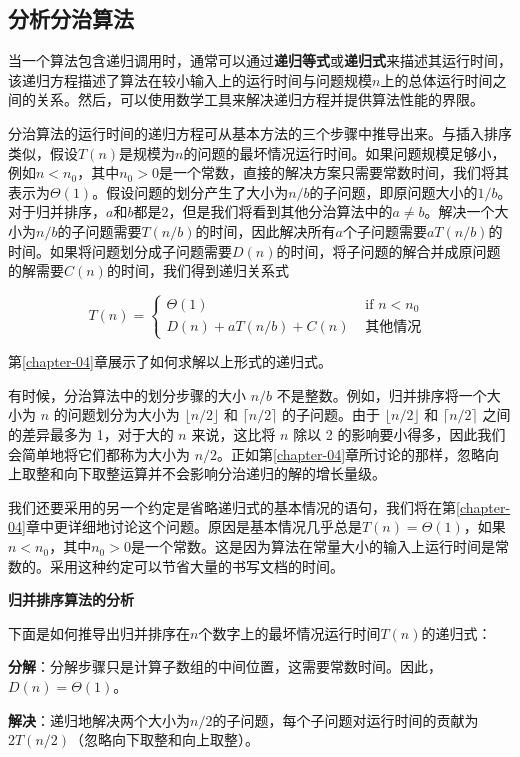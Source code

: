 \documentclass[lang=cn,newtx,10pt,scheme=chinese]{elegantbook}
\begin{document}
\subsection{分析分治算法}\label{subsection-2.3.2}

当一个算法包含递归调用时，通常可以通过\textbf{递归等式}或\textbf{递归式}来描述其运行时间，该递归方程描述了算法在较小输入上的运行时间与问题规模$n$上的总体运行时间之间的关系。然后，可以使用数学工具来解决递归方程并提供算法性能的界限。

分治算法的运行时间的递归方程可从基本方法的三个步骤中推导出来。与插入排序类似，假设$T(n)$是规模为$n$的问题的最坏情况运行时间。如果问题规模足够小，例如$n < n_0$，其中$n_0 > 0$是一个常数，直接的解决方案只需要常数时间，我们将其表示为$\Theta(1)$。假设问题的划分产生了大小为$n/b$的子问题，即原问题大小的$1/b$。对于归并排序，$a$和$b$都是$2$，但是我们将看到其他分治算法中的$a\neq b$。解决一个大小为$n/b$的子问题需要$T(n/b)$的时间，因此解决所有$a$个子问题需要$aT(n/b)$的时间。如果将问题划分成子问题需要$D(n)$的时间，将子问题的解合并成原问题的解需要$C(n)$的时间，我们得到递归关系式

$$
T(n)= \begin{cases}\Theta(1) & \text { if } n<n_0 \\ D(n)+a T(n / b)+C(n) & \text { 其他情况 }\end{cases}
$$

第\ref{chapter-04}章展示了如何求解以上形式的递归式。

有时候，分治算法中的划分步骤的大小 $n/b$ 不是整数。例如，归并排序将一个大小为 $n$ 的问题划分为大小为 $\lfloor{n/2}\rfloor$ 和 $\lceil{n/2}\rceil$ 的子问题。由于 $\lfloor{n/2}\rfloor$ 和 $\lceil{n/2}\rceil$ 之间的差异最多为 1，对于大的 $n$ 来说，这比将 $n$ 除以 2 的影响要小得多，因此我们会简单地将它们都称为大小为 $n/2$。正如第\ref{chapter-04}章所讨论的那样，忽略向上取整和向下取整运算并不会影响分治递归的解的增长量级。

我们还要采用的另一个约定是省略递归式的基本情况的语句，我们将在第\ref{chapter-04}章中更详细地讨论这个问题。原因是基本情况几乎总是$T(n)=\Theta(1)$，如果$n < n_0$，其中$n_0 > 0$是一个常数。这是因为算法在常量大小的输入上运行时间是常数的。采用这种约定可以节省大量的书写文档的时间。

\textbf{归并排序算法的分析}

下面是如何推导出归并排序在$n$个数字上的最坏情况运行时间$T(n)$的递归式：

\textbf{分解}：分解步骤只是计算子数组的中间位置，这需要常数时间。因此，$D(n)=\Theta(1)$。

\textbf{解决}：递归地解决两个大小为$n/2$的子问题，每个子问题对运行时间的贡献为$2T(n/2)$（忽略向下取整和向上取整）。
\end{document}
